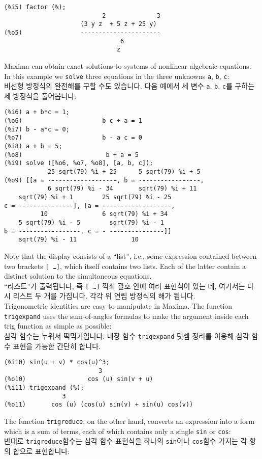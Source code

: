 \documentclass[a4paper,12pt]{article}
\begin{document}
\begin{verbatim}
(%i5) factor (%);
                           2              3
                     (3 y z  + 5 z + 25 y)
(%o5)                ----------------------
                                6
                               z
\end{verbatim}

Maxima can obtain exact solutions to systems of nonlinear algebraic 
equations.  In this example we {\tt solve} three equations in the 
three unknowns {\tt a}, {\tt b}, {\tt c}: \\
 비선형 방정식의 완전해를 구할 수도 있습니다. 다음 예에서 
세 변수 {\tt a}, {\tt b}, {\tt c}를 구하는 세 방정식을 풀어봅니다: 
\begin{verbatim}
(%i6) a + b*c = 1;
(%o6)                      b c + a = 1
(%i7) b - a*c = 0;
(%o7)                      b - a c = 0
(%i8) a + b = 5;
(%o8)                       b + a = 5
(%i9) solve ([%o6, %o7, %o8], [a, b, c]);
            25 sqrt(79) %i + 25      5 sqrt(79) %i + 5
(%o9) [[a = -------------------, b = -----------------, 
            6 sqrt(79) %i - 34       sqrt(79) %i + 11
    sqrt(79) %i + 1        25 sqrt(79) %i - 25
c = ---------------], [a = -------------------, 
          10               6 sqrt(79) %i + 34
    5 sqrt(79) %i - 5        sqrt(79) %i - 1
b = -----------------, c = - ---------------]]
    sqrt(79) %i - 11               10
\end{verbatim}
Note that the display consists of a ``list'', i.e., some expression 
contained between two brackets {\tt [ \ldots ]}, which itself contains 
two lists.  Each of the latter contain a distinct solution to the 
simultaneous equations. \\
``리스트''가 출력됩니다, 즉 {\tt [ \ldots ]} 꺽쇠 괄호 안에 여러 표현식이 있는 데, 
여기서는 다시 리스트 두 개를 가집니다. 각각 위 연립 방정식의 해가 됩니다. \\

Trigonometric identities are easy to manipulate in Maxima.  The 
function {\tt trigexpand} uses the sum-of-angles formulas to make the 
argument inside each trig function as simple as possible:  \\
삼각 함수는 누워서 떡먹기입니다. 내장 함수 {\tt trigexpand} 덧셈 정리를 이용해 
삼각 함수 표현을 가능한 간단히 합니다.

\begin{verbatim}
(%i10) sin(u + v) * cos(u)^3;
                          3
(%o10)                 cos (u) sin(v + u)
(%i11) trigexpand (%);
                3
(%o11)       cos (u) (cos(u) sin(v) + sin(u) cos(v))
\end{verbatim}
The function {\tt trigreduce}, on the other hand, converts an 
expression into a form which is a sum of terms, each of which contains 
only a single {\tt sin} or {\tt cos}: \\
반대로 {\tt trigreduce}함수는 삼각 함수 표현식을 하나의 {\tt sin}이나 
{\tt cos}함수 가지는 각 항의 합으로 표현합니다:
\end{document}
